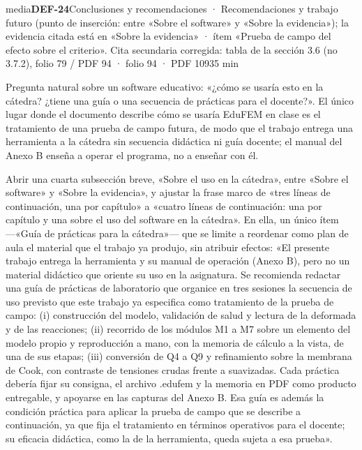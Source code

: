 \begin{ficha}{media}{\casilla\textbf{DEF-24}\quad{}\quad Conclusiones y recomendaciones · Recomendaciones y trabajo futuro (punto de inserción: entre «Sobre el software» y «Sobre la evidencia»); la evidencia citada está en «Sobre la evidencia» · ítem «Prueba de campo del efecto sobre el criterio». Cita secundaria corregida: tabla de la sección 3.6 (no 3.7.2), folio 79 /\allowbreak{} PDF 94 · folio 94 · PDF 109\hfill 35 min}
\par
{}Pregunta natural sobre un software educativo: «¿cómo se usaría esto en la cátedra? ¿tiene una guía o una secuencia de prácticas para el docente?». El único lugar donde el documento describe cómo se usaría EduFEM en clase es el tratamiento de una prueba de campo futura, de modo que el trabajo entrega una herramienta a la cátedra sin secuencia didáctica ni guía docente; el manual del Anexo B enseña a operar el programa, no a enseñar con él.\par
{}Abrir una cuarta subsección breve, «Sobre el uso en la cátedra», entre «Sobre el software» y «Sobre la evidencia», y ajustar la frase marco de «tres líneas de continuación, una por capítulo» a «cuatro líneas de continuación: una por capítulo y una sobre el uso del software en la cátedra». En ella, un único ítem —«Guía de prácticas para la cátedra»— que se limite a reordenar como plan de aula el material que el trabajo ya produjo, sin atribuir efectos: «El presente trabajo entrega la herramienta y su manual de operación (Anexo B), pero no un material didáctico que oriente su uso en la asignatura. Se recomienda redactar una guía de prácticas de laboratorio que organice en tres sesiones la secuencia de uso previsto que este trabajo ya especifica como tratamiento de la prueba de campo: (i) construcción del modelo, validación de salud y lectura de la deformada y de las reacciones; (ii) recorrido de los módulos M1 a M7 sobre un elemento del modelo propio y reproducción a mano, con la memoria de cálculo a la vista, de una de sus etapas; (iii) conversión de Q4 a Q9 y refinamiento sobre la membrana de Cook, con contraste de tensiones crudas frente a suavizadas. Cada práctica debería fijar su consigna, el archivo .edufem y la memoria en PDF como producto entregable, y apoyarse en las capturas del Anexo B. Esa guía es además la condición práctica para aplicar la prueba de campo que se describe a continuación, ya que fija el tratamiento en términos operativos para el docente; su eficacia didáctica, como la de la herramienta, queda sujeta a esa prueba».\par

\end{ficha}
